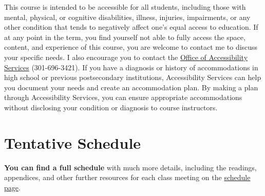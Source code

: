 \documentclass{article}
\begin{document}
This course is intended to be accessible for all students, including
those with mental, physical, or cognitive disabilities, illness,
injuries, impairments, or any other condition that tends to negatively
affect one's equal access to education. If at any point in the term, you
find yourself not able to fully access the space, content, and
experience of this course, you are welcome to contact me to discuss your
specific needs. I also encourage you to contact the
\href{https://www.hood.edu/academics/josephine-steiner-center-academic-achievement-retention/accessibility-services}{Office
of Accessibility Services} (301-696-3421). If you have a diagnosis or
history of accommodations in high school or previous postsecondary
institutions, Accessibility Services can help you document your needs
and create an accommodation plan. By making a plan through Accessibility
Services, you can ensure appropriate accommodations without disclosing
your condition or diagnosis to course instructors.

\hypertarget{tentative-schedule}{%
\section{Tentative Schedule}\label{tentative-schedule}}

\textbf{You can find a full schedule} with much more details, including
the readings, appendices, and other further resources for each class
meeting on the \href{schedule/}{schedule page}.
\end{document}
